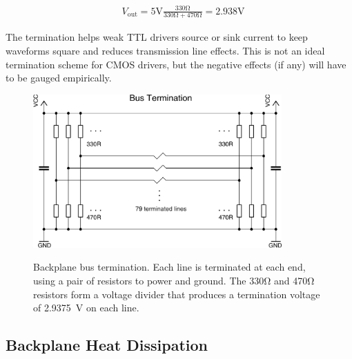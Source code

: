 \begin{eqnarray}
& V_{\mbox{out}} =  5\mbox{V} \frac{\displaystyle330\mbox{Ω}}{\displaystyle 330\mbox{Ω} + 470\mbox{Ω}} = 2.938\mbox{V}\nonumber
\end{eqnarray}

The termination helps weak TTL drivers source or sink current to keep waveforms
square and reduces transmission line effects. This is not an ideal termination
scheme for CMOS drivers, but the negative effects (if any) will have to be
gauged empirically.

\begin{figure}
\centering
\includegraphics[width=0.85\textwidth]{figs/bus-termination.pdf}\\
\caption[Backplane bus termination]{\label{fig:bus-termination}Backplane bus
  termination. Each line is terminated at each end, using a pair of resistors
  to power and ground. The 330Ω and 470Ω resistors form a voltage divider that
  produces a termination voltage of 2.9375~V on each line.}
\end{figure}



\subsection{Backplane Heat Dissipation}

